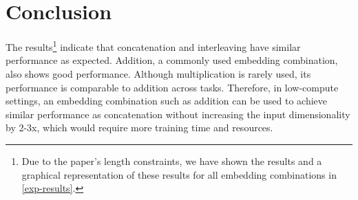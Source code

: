 \documentclass{article} %
\begin{document}
\section{Conclusion}


The results\footnote{Due to the paper's length constraints, we have shown the results and a graphical representation of these results for all embedding combinations in \ref{exp-results}.} indicate that concatenation and interleaving have similar performance as expected. Addition, a commonly used embedding combination, also shows good performance. Although multiplication is rarely used, its performance is comparable to addition across tasks. Therefore, in low-compute settings, an embedding combination such as addition can be used to achieve similar performance as concatenation without increasing the input dimensionality by 2-3x, which would require more training time and resources.



\end{document}
